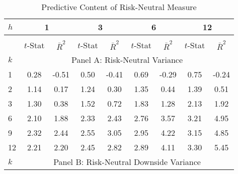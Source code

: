 \documentclass[11pt]{article}
\begin{document}
\begin{table}
  \caption{Predictive Content of Risk-Neutral Measure}\label{TabRiskNeutralOverLappingRegressionResults}
  \begin{center}
    \begin{tabular}{lllllllll}
\hline
$h$ & \multicolumn{2}{c}{1} & \multicolumn{2}{c}{3} & \multicolumn{2}{c}{6} & \multicolumn{2}{c}{12} \\
\hline
 & \multicolumn{8}{c}{} \\
 & \multicolumn{1}{c}{$t$-Stat} & \multicolumn{1}{c}{$\bar{R}^2$} & \multicolumn{1}{c}{$t$-Stat} & \multicolumn{1}{c}{$\bar{R}^2$} & \multicolumn{1}{c}{$t$-Stat} & \multicolumn{1}{c}{$\bar{R}^2$} & \multicolumn{1}{c}{$t$-Stat} & \multicolumn{1}{c}{$\bar{R}^2$} \\
\hline
$k$ & \multicolumn{8}{c}{Panel A: Risk-Neutral Variance } \\
\hline
1 & \multicolumn{1}{c}{0.28} & \multicolumn{1}{c}{-0.51} & \multicolumn{1}{c}{0.50} & \multicolumn{1}{c}{-0.41} & \multicolumn{1}{c}{0.69} & \multicolumn{1}{c}{-0.29} & \multicolumn{1}{c}{0.75} & \multicolumn{1}{c}{-0.24} \\
2 & \multicolumn{1}{c}{1.14} & \multicolumn{1}{c}{0.17} & \multicolumn{1}{c}{1.24} & \multicolumn{1}{c}{0.30} & \multicolumn{1}{c}{1.35} & \multicolumn{1}{c}{0.44} & \multicolumn{1}{c}{1.39} & \multicolumn{1}{c}{0.51} \\
3 & \multicolumn{1}{c}{1.30} & \multicolumn{1}{c}{0.38} & \multicolumn{1}{c}{1.52} & \multicolumn{1}{c}{0.72} & \multicolumn{1}{c}{1.83} & \multicolumn{1}{c}{1.28} & \multicolumn{1}{c}{2.13} & \multicolumn{1}{c}{1.92} \\
6 & \multicolumn{1}{c}{2.10} & \multicolumn{1}{c}{1.88} & \multicolumn{1}{c}{2.33} & \multicolumn{1}{c}{2.43} & \multicolumn{1}{c}{2.76} & \multicolumn{1}{c}{3.57} & \multicolumn{1}{c}{3.21} & \multicolumn{1}{c}{4.95} \\
9 & \multicolumn{1}{c}{2.32} & \multicolumn{1}{c}{2.44} & \multicolumn{1}{c}{2.55} & \multicolumn{1}{c}{3.05} & \multicolumn{1}{c}{2.95} & \multicolumn{1}{c}{4.22} & \multicolumn{1}{c}{3.15} & \multicolumn{1}{c}{4.85} \\
12 & \multicolumn{1}{c}{2.21} & \multicolumn{1}{c}{2.20} & \multicolumn{1}{c}{2.45} & \multicolumn{1}{c}{2.82} & \multicolumn{1}{c}{2.89} & \multicolumn{1}{c}{4.11} & \multicolumn{1}{c}{3.30} & \multicolumn{1}{c}{5.45} \\
\hline
$k$ & \multicolumn{8}{c}{Panel B: Risk-Neutral Downside Variance} \\

\end{tabular}
\end{center}
\end{table}
\end{document}
